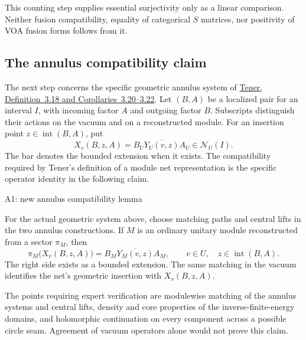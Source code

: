 This counting step supplies essential surjectivity only as a linear
comparison.  Neither fusion compatibility, equality of categorical
$S$ matrices, nor positivity of VOA fusion forms follows from it.

\subsection{The annulus compatibility claim}
\label{subsec:analytic-annuli}

The next step concerns the specific geometric annulus system of
\href{https://arxiv.org/html/1810.08168#S3.SS4}
{Tener, Definition~3.18 and Corollaries~3.20--3.22}.
Let $(B,A)$ be a localized pair for an interval $I$, with incoming
factor $A$ and outgoing factor $B$.  Subscripts distinguish their
actions on the vacuum and on a reconstructed module.  For an insertion
point $z\in\operatorname{int}(B,A)$, put
\[
 X_v(B,z,A)=\overline{B_UY_U(v,z)A_U}\in\mathcal N_U(I).
\]
The bar denotes the bounded extension when it exists.  The compatibility
required by Tener's definition of a module net representation is the
specific operator identity in the following claim.

\begin{criticalnote}{A1: new annulus compatibility lemma}
\begin{claim}
\label{clm:analytic-annulus}
For the actual geometric system above, choose matching paths and
central lifts in the two annulus constructions.  If $M$ is an ordinary
unitary module reconstructed from a sector $\pi_M$, then
\begin{equation}
 \pi_M\bigl(X_v(B,z,A)\bigr)
   =\overline{B_MY_M(v,z)A_M},
 \qquad v\in U,\quad z\in\operatorname{int}(B,A).
 \label{eq:analytic-annulus-identity}
\end{equation}
The right side exists as a bounded extension.  The same matching in the
vacuum identifies the net's geometric insertion with $X_v(B,z,A)$.
\end{claim}
The points requiring expert verification are modulewise matching of
the annulus systems and central lifts, density and core properties of
the inverse-finite-energy domains, and holomorphic continuation on every
component across a possible circle seam.  Agreement of vacuum operators
alone would not prove this claim.
\end{criticalnote}

